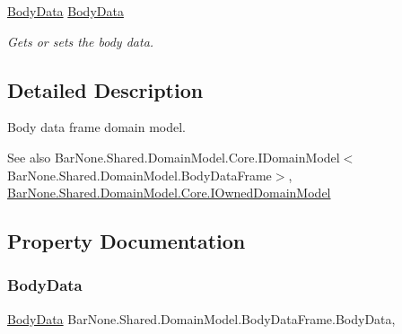 \begin{DoxyCompactItemize}
\mbox{\hyperlink{class_bar_none_1_1_shared_1_1_domain_model_1_1_body_data}{Body\+Data}} \mbox{\hyperlink{class_bar_none_1_1_shared_1_1_domain_model_1_1_body_data_frame_af25537401c88d88a694f09c055389cad}{Body\+Data}}
\begin{DoxyCompactList}\small\item\em Gets or sets the body data. \end{DoxyCompactList}\end{DoxyCompactItemize}


\subsection{Detailed Description}
Body data frame domain model. 

\begin{DoxySeeAlso}{See also}
Bar\+None.\+Shared.\+Domain\+Model.\+Core.\+I\+Domain\+Model$<$\+Bar\+None.\+Shared.\+Domain\+Model.\+Body\+Data\+Frame$>$, \mbox{\hyperlink{interface_bar_none_1_1_shared_1_1_domain_model_1_1_core_1_1_i_owned_domain_model}{Bar\+None.\+Shared.\+Domain\+Model.\+Core.\+I\+Owned\+Domain\+Model}}


\end{DoxySeeAlso}


\subsection{Property Documentation}
\mbox{\label{class_bar_none_1_1_shared_1_1_domain_model_1_1_body_data_frame_af25537401c88d88a694f09c055389cad}} 
\subsubsection{\texorpdfstring{Body\+Data}{BodyData}}
{\footnotesize\ttfamily \mbox{\hyperlink{class_bar_none_1_1_shared_1_1_domain_model_1_1_body_data}{Body\+Data}} Bar\+None.\+Shared.\+Domain\+Model.\+Body\+Data\+Frame.\+Body\+Data\hspace{0.3cm}{\ttfamily [get]}, {\ttfamily [set]}}



